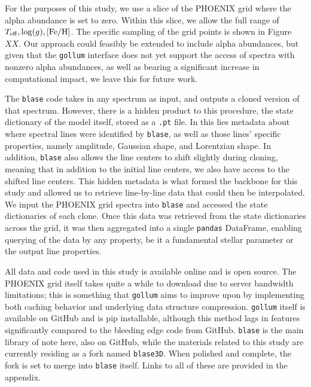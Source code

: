 \documentclass[twocolumn]{aastex631}
\def\Teff{T_{\rm eff}}
\def\logg{\log(g)}
\def\Z{\mathrm{[Fe/H]}}
\begin{document}
For the purposes of this study, we use a slice of the PHOENIX grid where the alpha abundance
is set to zero. Within this slice, we allow the full range of $\Teff, \logg, \Z$. The specific
sampling of the grid points is shown in Figure $XX$. Our approach could feasibly be extended to
include alpha abundances, but given that the \texttt{gollum} interface does not yet support the access
of spectra with nonzero alpha abundances, as well as bearing a significant increase in computational
impact, we leave this for future work.

The \texttt{blase} code takes in any spectrum as input, and outputs a cloned
version of that spectrum. However, there is a hidden product to this
procedure, the state dictionary of the model itself, stored as a \texttt{.pt} file. In this lies metadata about
where spectral lines were identified by \texttt{blase}, as well as those lines'
specific properties, namely amplitude, Gaussian shape, and Lorentzian shape.
In addition, \texttt{blase} also allows the line centers to shift slightly during
cloning, meaning that in addition to the initial line centers, we
also have access to the shifted line centers. This hidden metadata is
what formed the backbone for this study and allowed us to retrieve line-by-line data
that could then be interpolated. We input the PHOENIX grid spectra into \texttt{blase}
and accessed the state dictionaries of each clone. Once this data was retrieved from the state dictionaries
across the grid, it was then aggregated into a single \texttt{pandas} DataFrame, enabling
querying of the data by any property, be it a fundamental stellar parameter or the output
line properties.

All data and code used in this study is available online and is open source. The PHOENIX grid itself takes quite a while to download
due to server bandwidth limitations; this is something that \texttt{gollum} aims to
improve upon by implementing both caching behavior and underlying data structure compression.
\texttt{gollum} itself is available on GitHub and is pip installable, although this
method lags in features significantly compared to the bleeding edge code from GitHub.
\texttt{blase} is the main library of note here, also on GitHub, while the
materials related to this study are currently residing as a fork named \texttt{blase3D}. When polished and complete,
the fork is set to merge into \texttt{blase} itself. Links to all of these are provided in the appendix.
\end{document}
